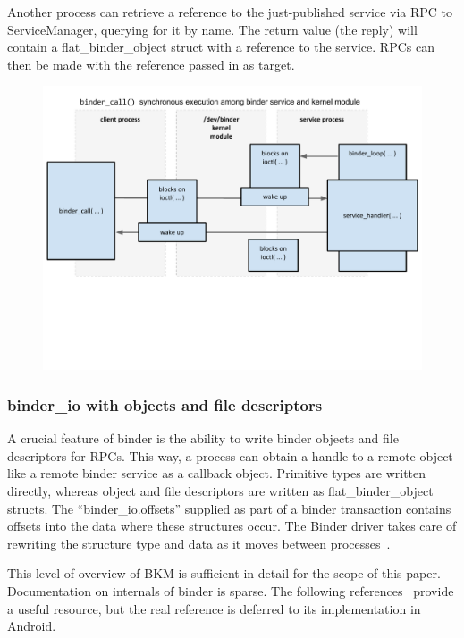 \documentclass[prodmode]{acmlarge}
\begin{document}
Another process can retrieve a reference to the just-published service via RPC to ServiceManager, querying for it by name. The return value (the reply) will contain a flat\_binder\_object struct with a reference to the service. RPCs can then be made with the reference passed in as target.
\begin{figure}[h]
\centering
\includegraphics[width=\textwidth]{drawings/binder_call.pdf}
\end{figure}

\subsubsection{binder\_io with objects and file descriptors}
A crucial feature of binder is the ability to write binder objects and file descriptors for RPCs. This way, a process can obtain a handle to a remote object like a remote binder service as a callback object. Primitive types are written directly, whereas object and file descriptors are written as flat\_binder\_object structs. The ``binder\_io.offsets'' supplied as part of a binder transaction contains offsets into the data where these structures occur. The Binder driver takes care of rewriting the structure type and data as it moves between processes~\cite{BinderSourceComment}.

This level of overview of BKM is sufficient in detail for the scope of this paper. Documentation on internals of binder is sparse. The following references~\cite{BinderLinuxFoundation,BinderMastersThesis} provide a useful resource, but the real reference is deferred to its implementation in Android.
\end{document}
